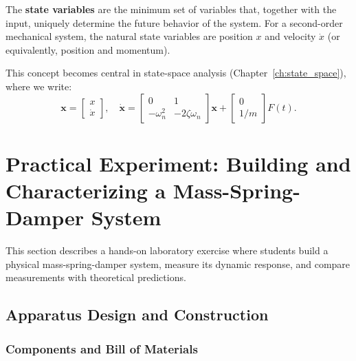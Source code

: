 The \textbf{state variables} are the minimum set of variables that, together with the input, uniquely determine the future behavior of the system. For a second-order mechanical system, the natural state variables are position $x$ and velocity $\dot{x}$ (or equivalently, position and momentum).

This concept becomes central in state-space analysis (Chapter~\ref{ch:state_space}), where we write:
\begin{equation}
\mathbf{x} = \begin{bmatrix} x \\ \dot{x} \end{bmatrix}, \quad
\dot{\mathbf{x}} = \begin{bmatrix} 0 & 1 \\ -\omega_n^2 & -2\zeta\omega_n \end{bmatrix}\mathbf{x} + \begin{bmatrix} 0 \\ 1/m \end{bmatrix}F(t).
\end{equation}


\section{Practical Experiment: Building and Characterizing a Mass-Spring-Damper System}

This section describes a hands-on laboratory exercise where students build a physical mass-spring-damper system, measure its dynamic response, and compare measurements with theoretical predictions.

\subsection{Apparatus Design and Construction}

\subsubsection{Components and Bill of Materials}

